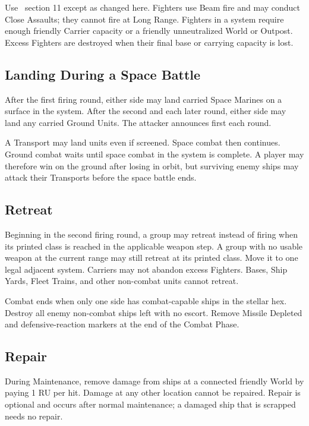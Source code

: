 Use \SpaceEmpires\ section 11 except as changed here. Fighters use Beam fire
and may conduct Close Assaults; they cannot fire at Long Range. Fighters in a
system require enough friendly Carrier capacity or a friendly unneutralized
World or Outpost. Excess Fighters are destroyed when their final base or
carrying capacity is lost.

\subsection{Landing During a Space Battle}

After the first firing round, either side may land carried Space Marines on a
surface in the system. After the second and each later round, either side may
land any carried Ground Units. The attacker announces first each round.

A Transport may land units even if screened. Space combat then continues.
Ground combat waits until space combat in the system is complete. A player may
therefore win on the ground after losing in orbit, but surviving enemy ships
may attack their Transports before the space battle ends.

\subsection{Retreat}

Beginning in the second firing round, a group may retreat instead of firing
when its printed class is reached in the applicable weapon step. A group with
no usable weapon at the current range may still retreat at its printed class.
Move it to one legal adjacent system. Carriers may not abandon excess Fighters.
Bases, Ship Yards, Fleet Trains, and other non-combat units cannot retreat.

Combat ends when only one side has combat-capable ships in the stellar hex.
Destroy all enemy non-combat ships left with no escort. Remove Missile Depleted
and defensive-reaction markers at the end of the Combat Phase.

\subsection{Repair}

During Maintenance, remove damage from ships at a connected friendly World by
paying 1 RU per hit. Damage at any other location cannot be repaired. Repair is
optional and occurs after normal maintenance; a damaged ship that is scrapped
needs no repair.
